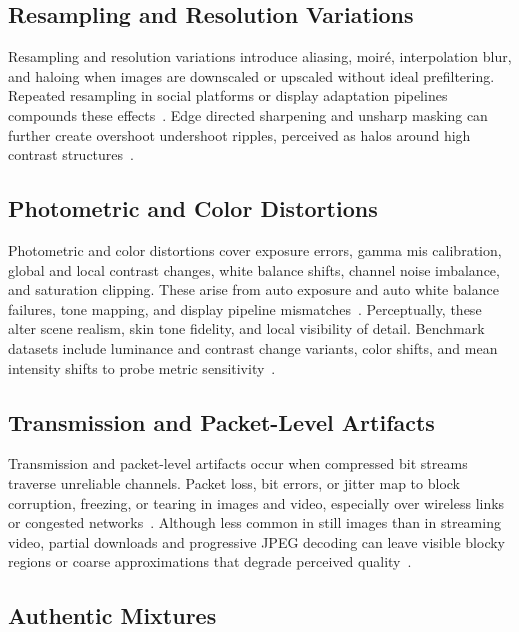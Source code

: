 \subsection{Resampling and Resolution Variations}\label{sec:resampling}

Resampling and resolution variations introduce aliasing, moiré, interpolation blur, and haloing when images are downscaled or upscaled without ideal prefiltering. Repeated resampling in social platforms or display adaptation pipelines compounds these effects~\cite{gonzalez2009digital,waterloo}. Edge directed sharpening and unsharp masking can further create overshoot undershoot ripples, perceived as halos around high contrast structures~\cite{survey2006wang}.

\subsection{Photometric and Color Distortions}\label{sec:photometric}

Photometric and color distortions cover exposure errors, gamma mis calibration, global and local contrast changes, white balance shifts, channel noise imbalance, and saturation clipping. These arise from auto exposure and auto white balance failures, tone mapping, and display pipeline mismatches~\cite{survey2017aquisition,ntsc1953yiq}. Perceptually, these alter scene realism, skin tone fidelity, and local visibility of detail. Benchmark datasets include luminance and contrast change variants, color shifts, and mean intensity shifts to probe metric sensitivity~\cite{tid2013,kadid10k}.

\subsection{Transmission and Packet-Level Artifacts}\label{sec:transmission}

Transmission and packet-level artifacts occur when compressed bit streams traverse unreliable channels. Packet loss, bit errors, or jitter map to block corruption, freezing, or tearing in images and video, especially over wireless links or congested networks~\cite{chandra2016transmission,survey2019transmission}. Although less common in still images than in streaming video, partial downloads and progressive \acs{JPEG} decoding can leave visible blocky regions or coarse approximations that degrade perceived quality~\cite{rabbani1991digital, livewebsite}.

\subsection{Authentic Mixtures}\label{sec:authentic_mixtures}

